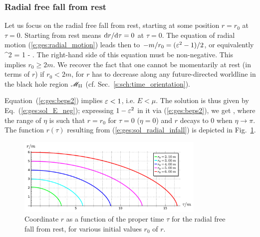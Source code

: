 \subsubsection{Radial free fall from rest}

Let us focus on the radial free fall from rest, starting at some
position $r=r_0$ at $\tau=0$. Starting from rest
means $\mathrm{d} r/\mathrm{d}\tau = 0$ at $\tau=0$. The equation of radial motion
(\ref{e:ges:radial_motion}) leads then to $-m/r_0 = (\varepsilon^2 - 1)/2$,
or equivalently
\be \label{e:ges:beps2}
         \veps^2 = 1 -  .
\ee
The right-hand side of this equation must be non-negative. This implies
$r_0\geq 2m$. We recover the fact that one cannot be momentarily at rest
(in terms of $r$) if $r_0<2m$, for $r$ has to decrease along any future-directed
worldline in the black hole region $\mathscr{M}_{\rm II}$ (cf. Sec.~\ref{s:sch:time_orientation}).

Equation~(\ref{e:ges:beps2}) implies $\varepsilon < 1$, i.e. $E < \mu$. The solution
is thus given by Eq.~(\ref{e:ges:sol_E_neg}); expressing $1-\varepsilon^2$
in it via (\ref{e:ges:beps2}), we get
\be \label{e:ges:sol_radial_infall}
     \leq \eta \leq \pi ,
\ee
where the range of $\eta$ is such that $r=r_0$ for $\tau=0$ ($\eta=0$) and
$r$ decays to $0$ when $\eta\rightarrow \pi$. The function $r(\tau)$ resulting
from (\ref{e:ges:sol_radial_infall}) is depicted in
Fig.~\ref{f:ges:radial_infall_tau}.

\begin{figure}
\centerline{\includegraphics[width=0.8\textwidth]{ges_radial_infall_tau.pdf}}
\caption[]{\label{f:ges:radial_infall_tau} \footnotesize
Coordinate $r$ as a function of the proper time $\tau$
for the radial free fall from rest, for various initial values $r_0$ of $r$.}
\end{figure}

